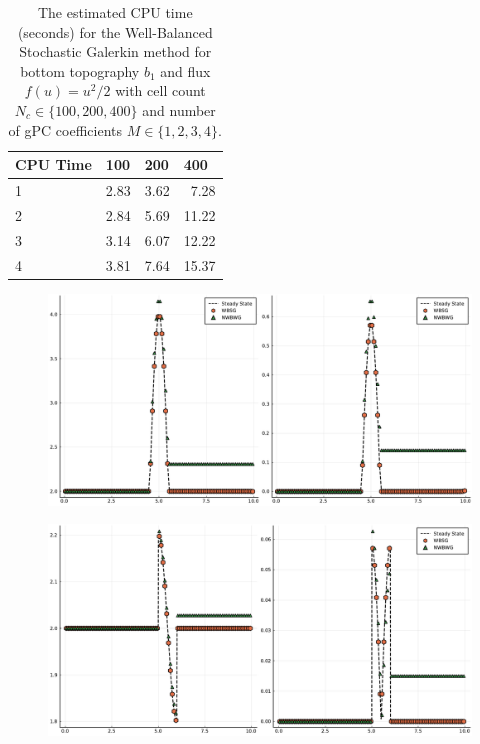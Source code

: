 \documentclass[12pt]{article}
\begin{document}
\begin{table}[!htb]
\centering
\begin{tabular}{@{}l|lll@{}}
\toprule
CPU Time & 100  & 200  & 400   \\ \midrule
1        & 2.83 & 3.62 & \ 7.28  \\
2        & 2.84 & 5.69 & 11.22 \\
3        & 3.14 & 6.07 & 12.22 \\
4        & 3.81 & 7.64 & 15.37 \\ \bottomrule
\end{tabular}
\caption{The estimated CPU time (seconds) for the Well-Balanced Stochastic Galerkin method for bottom topography $b_1$ and flux $f(u) = u^2/2$ with cell count $N_c \in \{100, 200, 400\}$ and number of gPC coefficients $M \in \{1,2,3,4\}$.}
\label{tab:cpu-time}
\end{table}

\begin{figure}[!htb]
    \centering
    \includegraphics[width=\textwidth]{Figures/b1}
    \caption{}
    \label{fig:b1}
\end{figure}

\begin{figure}[!htb]
    \centering
    \includegraphics[width=\textwidth]{Figures/b2}
    \caption{}
    \label{fig:b2}
\end{figure}
\end{document}
